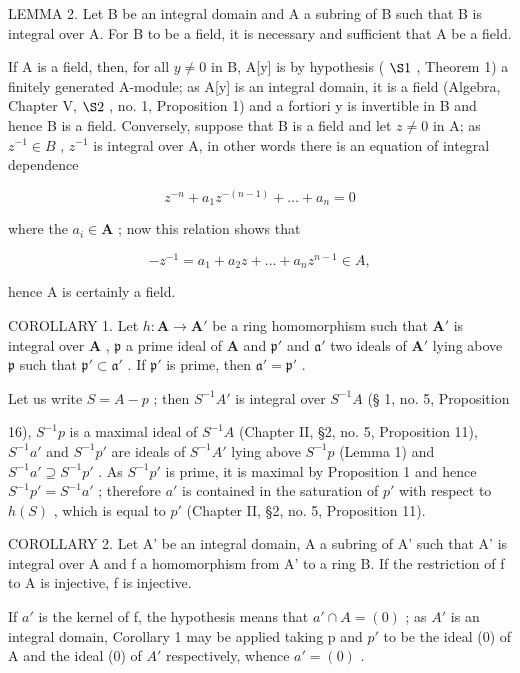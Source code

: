LEMMA 2. Let B be an integral domain and A a subring of B such that B is integral over A. For B to be a field, it is necessary and sufficient that A be a field.

If A is a field, then, for all \(y \neq 0\) in B, A[y] is by hypothesis ( \(\S 1\) , Theorem 1) a finitely generated A-module; as A[y] is an integral domain, it is a field (Algebra, Chapter V, \(\S 2\) , no. 1, Proposition 1) and a fortiori y is invertible in B and hence B is a field. Conversely, suppose that B is a field and let \(z \neq 0\) in A; as \(z^{-1} \in B\) , \(z^{-1}\) is integral over A, in other words there is an equation of integral dependence

\[
z ^ {- n} + a _ {1} z ^ {- (n - 1)} + \dots + a _ {n} = 0
\]

where the \(a_{i} \in \mathbf{A}\) ; now this relation shows that

\[
- z ^ {- 1} = a _ {1} + a _ {2} z + \dots + a _ {n} z ^ {n - 1} \in A,
\]

hence A is certainly a field.

COROLLARY 1. Let \(h: \mathbf{A} \to \mathbf{A}'\) be a ring homomorphism such that \(\mathbf{A}'\) is integral over \(\mathbf{A}\) , \(\mathfrak{p}\) a prime ideal of \(\mathbf{A}\) and \(\mathfrak{p}'\) and \(\mathfrak{a}'\) two ideals of \(\mathbf{A}'\) lying above \(\mathfrak{p}\) such that \(\mathfrak{p}' \subset \mathfrak{a}'\) . If \(\mathfrak{p}'\) is prime, then \(\mathfrak{a}' = \mathfrak{p}'\) .

Let us write \(S = A - p\) ; then \(S^{-1}A'\) is integral over \(S^{-1}A\) (§ 1, no. 5, Proposition

16), \(S^{-1}p\) is a maximal ideal of \(S^{-1}A\) (Chapter II, §2, no. 5, Proposition 11), \(S^{-1}a'\) and \(S^{-1}p'\) are ideals of \(S^{-1}A'\) lying above \(S^{-1}p\) (Lemma 1) and \(S^{-1}a' \supseteq S^{-1}p'\) . As \(S^{-1}p'\) is prime, it is maximal by Proposition 1 and hence \(S^{-1}p' = S^{-1}a'\) ; therefore \(a'\) is contained in the saturation of \(p'\) with respect to \(h(S)\) , which is equal to \(p'\) (Chapter II, §2, no. 5, Proposition 11).

COROLLARY 2. Let A' be an integral domain, A a subring of A' such that A' is integral over A and f a homomorphism from A' to a ring B. If the restriction of f to A is injective, f is injective.

If \(a'\) is the kernel of f, the hypothesis means that \(a' \cap A = (0)\) ; as \(A'\) is an integral domain, Corollary 1 may be applied taking p and \(p'\) to be the ideal (0) of A and the ideal (0) of \(A'\) respectively, whence \(a' = (0)\) .

